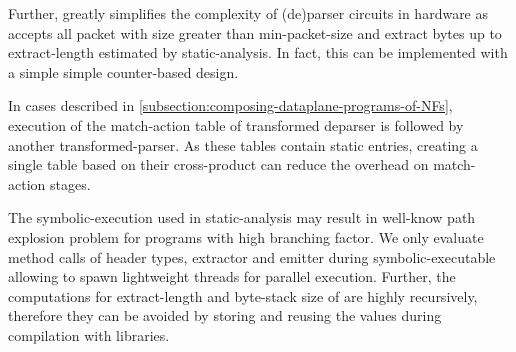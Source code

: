 \documentclass[letterpaper,twocolumn,10pt]{article}
\begin{document}
Further, \ucomp greatly simplifies the complexity of (de)parser
circuits in hardware as \ucomp accepts all packet with size greater
than min-packet-size and extract bytes up to extract-length estimated
by static-analysis. In fact, this can be implemented with a simple
simple counter-based design. 


 In cases described in
\cref{subsection:composing-dataplane-programs-of-NFs}, execution of
the match-action table of transformed deparser is followed by another
transformed-parser. As these tables contain static entries, creating a
single table based on their cross-product can reduce the overhead on
match-action stages.

The symbolic-execution used in static-analysis may result in 
well-know path explosion problem for programs with high branching 
factor.
We only evaluate method calls of header types, extractor and emitter 
during symbolic-executable allowing to spawn lightweight threads for 
parallel execution.
Further, the computations for extract-length and byte-stack size of 
\uprograms are highly recursively, therefore they can be avoided by 
storing and reusing the values during compilation with libraries.



\end{document}
